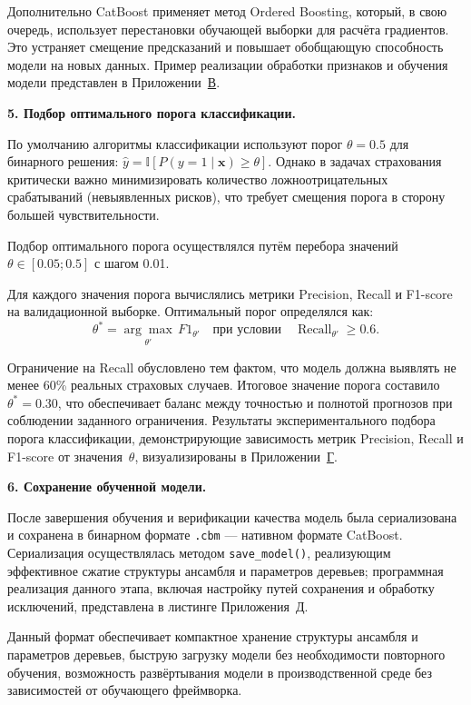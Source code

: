 Дополнительно CatBoost применяет метод Ordered Boosting, который, в свою очередь, использует перестановки обучающей выборки для расчёта градиентов. Это устраняет смещение предсказаний и повышает обобщающую способность модели на новых данных. Пример реализации обработки признаков и обучения модели представлен в Приложении~\hyperref[app:training]{В}.

\textbf{5. Подбор оптимального порога классификации.}

По умолчанию алгоритмы классификации используют порог $\theta = 0.5$ для бинарного решения: $\hat{y} = \mathbb{I}[P(y = 1 \mid \mathbf{x}) \geq \theta]$. Однако в задачах страхования критически важно минимизировать количество ложноотрицательных срабатываний (невыявленных рисков), что требует смещения порога в сторону большей чувствительности.

Подбор оптимального порога осуществлялся путём перебора значений $\theta \in [0.05; 0.5]$ с шагом 0.01. 

Для каждого значения порога вычислялись метрики Precision, Recall и F1-score на валидационной выборке. Оптимальный порог определялся как:
\begin{equation*}
\theta^* = \underset{\theta'}{\arg\max} \, F1_{\theta'} \quad \text{при условии} \quad \operatorname{Recall}_{\theta'} \geq 0.6.
\end{equation*}

Ограничение на Recall обусловлено тем фактом, что модель должна выявлять не менее 60\% реальных страховых случаев. Итоговое значение порога составило $\theta^* = 0.30$, что обеспечивает баланс между точностью и полнотой прогнозов при соблюдении заданного ограничения. Результаты экспериментального подбора порога классификации, демонстрирующие зависимость метрик Precision, Recall и F1-score от значения~$\theta$, визуализированы в Приложении~\hyperref[app:threshold]{Г}.

\textbf{6. Сохранение обученной модели.}

После завершения обучения и верификации качества модель была сериализована и сохранена в бинарном формате \texttt{.cbm} --- нативном формате CatBoost. Сериализация осуществлялась методом \texttt{save\_model()}, реализующим эффективное сжатие структуры ансамбля и параметров деревьев; программная реализация данного этапа, включая настройку путей сохранения и обработку исключений, представлена в листинге Приложения~\hyperref[app:save_model]{Д}.

Данный формат обеспечивает компактное хранение структуры ансамбля и параметров деревьев, быструю загрузку модели без необходимости повторного обучения, возможность развёртывания модели в производственной среде без зависимостей от обучающего фреймворка.

